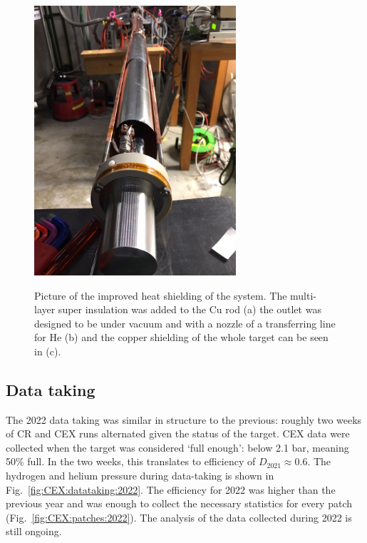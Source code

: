 \begin{refsection}
\begin{figure}
{            \includegraphics[height = 10cm, keepaspectratio]{Figures/LH2/2022/CEX2022_shielding.jpeg}}
            \caption{Picture of the improved heat shielding of the system. The multi-layer super insulation was added to the Cu rod (a) the outlet was designed to be under vacuum and with a nozzle of a transferring line for He (b) and the copper shielding of the whole target can be seen in (c).}
            \label{fig:CEX:2022:insulation}
        \end{figure}
        
    \subsection{Data taking}
        The 2022 data taking was similar in structure to the previous: roughly two weeks of CR and CEX runs alternated given the status of the target.
        CEX data were collected when the target was considered `full enough': below 2.1 bar, meaning 50\% full. 
        In the two weeks, this translates to efficiency of $D_{2021}\approx0.6$.
        The hydrogen and helium pressure during data-taking is shown in Fig.~\ref{fig:CEX:datataking:2022}.
        The efficiency for 2022 was higher than the previous year and was enough to collect the necessary statistics for every patch (Fig.~\ref{fig:CEX:patches:2022}).
        The analysis of the data collected during 2022 is still ongoing.


\end{refsection}
